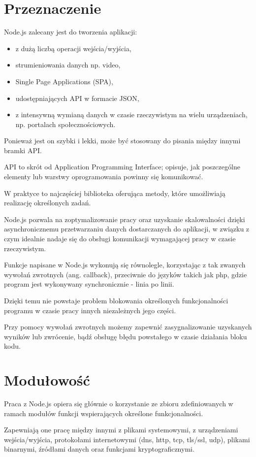 \documentclass[12pt]{report}
\begin{document}
\section{Przeznaczenie}
Node.js zalecany jest do tworzenia aplikacji: 
\begin{itemize}
\item z dużą liczbą operacji wejścia/wyjścia,
\item strumieniowania danych np.
video, 
\item Single Page Applications (SPA),
\item udostępniających API w formacie JSON,
\item z intensywną wymianą danych w czasie rzeczywistym na wielu urządzeniach, np.
portalach społecznościowych.
\end{itemize} 
Ponieważ jest on szybki i lekki, może być stosowany do pisania między innymi bramki API.

API to skrót od Application Programming Interface; opisuje, jak poszczególne elementy lub warstwy oprogramowania powinny się komunikować.

W praktyce to najczęściej biblioteka oferująca metody, które umożliwiają realizację określonych zadań.

Node.js pozwala na zoptymalizowanie pracy oraz uzyskanie skalowalności dzięki asynchronicznemu przetwarzaniu danych dostarczanych do aplikacji, w związku z czym idealnie nadaje się do obsługi komunikacji wymagającej pracy w czasie rzeczywistym.

Funkcje napisane w Node.js wykonują się równolegle, korzystając z tak zwanych wywołań zwrotnych (ang.
callback), przeciwnie do języków takich jak php, gdzie program jest wykonywany synchronicznie - linia po linii.

Dzięki temu nie powstaje problem blokowania określonych funkcjonalności programu w czasie pracy innych niezależnych jego części.

Przy pomocy wywołań zwrotnych możemy zapewnić zasygnalizowanie uzyskanych wyników lub zwrócenie, bądź obsługę błędu powstałego w czasie działania bloku kodu.

\section{Modułowość}
Praca z Node.js opiera się głównie o korzystanie ze zbioru zdefiniowanych w ramach modułów funkcji wspierających określone funkcjonalności.

Zapewniają one pracę między innymi z plikami systemowymi, z urządzeniami wejścia/wyjścia, protokołami internetowymi (dns, http, tcp, tls/ssl, udp), plikami binarnymi, źródłami danych oraz funkcjami kryptograficznymi.
\end{document}
